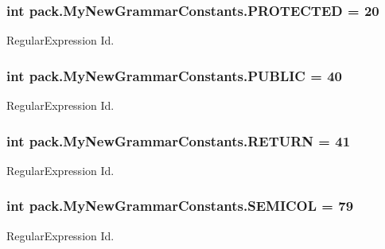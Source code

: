 \subsubsection[{\texorpdfstring{P\+R\+O\+T\+E\+C\+T\+ED}{PROTECTED}}]{\setlength{\rightskip}{0pt plus 5cm}int pack.\+My\+New\+Grammar\+Constants.\+P\+R\+O\+T\+E\+C\+T\+ED = 20}\hypertarget{interfacepack_1_1_my_new_grammar_constants_a67f4c673214f761a442920b269982e25}{}\label{interfacepack_1_1_my_new_grammar_constants_a67f4c673214f761a442920b269982e25}
Regular\+Expression Id. 
\subsubsection[{\texorpdfstring{P\+U\+B\+L\+IC}{PUBLIC}}]{\setlength{\rightskip}{0pt plus 5cm}int pack.\+My\+New\+Grammar\+Constants.\+P\+U\+B\+L\+IC = 40}\hypertarget{interfacepack_1_1_my_new_grammar_constants_a7f42cc2076d60b1daad9a29eebf0d945}{}\label{interfacepack_1_1_my_new_grammar_constants_a7f42cc2076d60b1daad9a29eebf0d945}
Regular\+Expression Id. 
\subsubsection[{\texorpdfstring{R\+E\+T\+U\+RN}{RETURN}}]{\setlength{\rightskip}{0pt plus 5cm}int pack.\+My\+New\+Grammar\+Constants.\+R\+E\+T\+U\+RN = 41}\hypertarget{interfacepack_1_1_my_new_grammar_constants_a8eee2c5c9c778299beb4c17f8920caae}{}\label{interfacepack_1_1_my_new_grammar_constants_a8eee2c5c9c778299beb4c17f8920caae}
Regular\+Expression Id. 
\subsubsection[{\texorpdfstring{S\+E\+M\+I\+C\+OL}{SEMICOL}}]{\setlength{\rightskip}{0pt plus 5cm}int pack.\+My\+New\+Grammar\+Constants.\+S\+E\+M\+I\+C\+OL = 79}\hypertarget{interfacepack_1_1_my_new_grammar_constants_ac28ee4b244018973488ee1dec9cf1f84}{}\label{interfacepack_1_1_my_new_grammar_constants_ac28ee4b244018973488ee1dec9cf1f84}
Regular\+Expression Id. 
